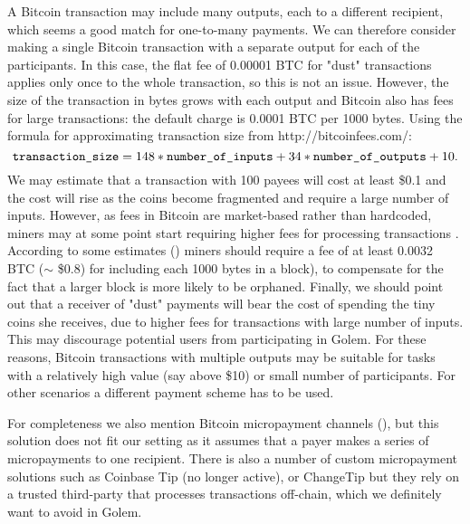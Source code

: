 \documentclass[a4paper]{article}
\begin{document}
    A Bitcoin transaction may include many outputs, each to a different recipient, which seems a good match for
    one-to-many payments. We can therefore consider making a single Bitcoin transaction with a separate output
    for each of the participants. In this case, the flat fee of 0.00001 BTC for "dust" transactions applies only
    once to the whole transaction, so this is not an issue. However, the size of the transaction in bytes grows with
    each output and Bitcoin also has fees for large transactions: the default charge is 0.0001 BTC per 1000 bytes.
    Using the formula for approximating transaction size from http://bitcoinfees.com/\cite{BITFEE}:
    \begin{displaymath}
	    \text{\texttt{transaction\_size}} = 148 * \text{\texttt{number\_of\_inputs}} +
	    34 * \text{\texttt{number\_of\_outputs}} + 10.
	\end{displaymath}
    We may estimate that a transaction with 100 payees will cost at least \$0.1 and the cost will rise as the coins
    become fragmented and require a large number of inputs. However, as fees in Bitcoin are market-based rather than
    hardcoded, miners may at some point start requiring higher fees for processing transactions \cite{KASKALOGLU}.
    According to some estimates (\cite{ANDRESEN}) miners should require a fee of
    at least 0.0032 BTC ($\sim$ \$0.8) for including each 1000 bytes in a block), to compensate for the fact that
    a larger block is more likely to be orphaned. Finally, we should point out that a receiver of "dust" payments will
    bear the cost of spending the tiny coins she receives, due to higher fees for transactions with large number of
    inputs. This may discourage potential users from participating in Golem. For these reasons, Bitcoin transactions
    with multiple outputs may be suitable for tasks with a relatively high value (say above \$10) or small number
    of participants. For other scenarios a different payment scheme has to be used.

    For completeness we also mention Bitcoin micropayment channels (\cite{BITCOINJ}), but this solution does not fit
    our setting as it assumes that a payer makes a series of micropayments to one recipient.
    There is also a number of custom micropayment solutions such as Coinbase Tip \cite{COINTIP}(no longer active),
    or ChangeTip \cite{CHANGETIP} but they rely on a trusted third-party that processes transactions off-chain,
    which we definitely want to avoid in Golem.
\end{document}
